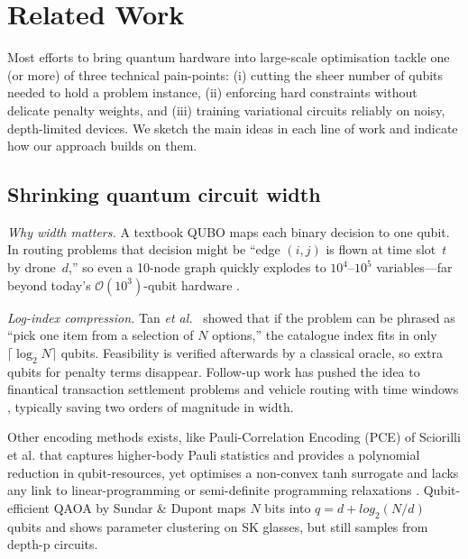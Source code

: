 \section{Related Work}
\label{sec:related_work}

Most efforts to bring quantum hardware into large-scale optimisation
tackle one (or more) of three technical pain-points:
(i) cutting the sheer number of qubits needed to hold a problem
instance, (ii) enforcing hard constraints without delicate penalty
weights, and (iii) training variational circuits reliably on noisy,
depth-limited devices.  We sketch the main ideas in each line of work
and indicate how our approach builds on them.

\subsection{Shrinking quantum circuit width}

\textit{Why width matters.}  
A textbook QUBO maps each binary decision to one qubit.
In routing problems that decision might be
“edge $(i,j)$ is flown at time slot~$t$ by drone~$d$,”
so even a 10-node graph quickly explodes to
$10^{4}$–$10^{5}$ variables—far beyond today’s $\mathcal{O}(10^3)$-qubit hardware
\cite{davies_quantum_2024}.

\textit{Log-index compression.}  
Tan \emph{et al.}~\cite{tan_qubit-efficient_2021} showed that if the
problem can be phrased as “pick one item from a selection of $N$
options,” the catalogue index fits in only
$\lceil\log_{2}N\rceil$ qubits.
Feasibility is verified afterwards by a classical oracle, so extra qubits
for penalty terms disappear.  Follow-up work has pushed the idea to
finantical transaction settlement problems \cite{huber_exponential_2024} and vehicle routing with time
windows \cite{leonidas_qubit_2023}, typically saving two orders
of magnitude in width.

Other encoding methods exists, like Pauli-Correlation Encoding (PCE)
of Sciorilli et al. that captures higher-body Pauli statistics and provides a polynomial reduction in qubit-resources, yet optimises a non-convex tanh surrogate and lacks any link to linear-programming or semi-definite programming relaxations \cite{sciorilli_towards_2025}. Qubit-efficient QAOA by Sundar \& Dupont \cite{sundar_qubit-efficient_2024} maps $N$ bits into $q = d + log_2 (N/d)$ qubits and shows parameter clustering on SK glasses, but still samples from depth-p circuits.

